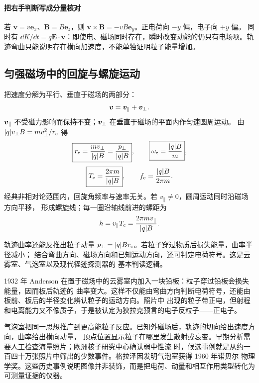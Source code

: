 {%
\paragraph{把右手判断写成分量核对}
若 $\boldsymbol v=v\boldsymbol e_x$、$\boldsymbol B=B\boldsymbol e_z$，则
$\boldsymbol v\times\boldsymbol B=-vB\boldsymbol e_y$。正电荷向 $-y$ 偏，电子向 $+y$ 偏。
同时有 $\dd K/\dd t=q\boldsymbol E\cdot\boldsymbol v$：即使电、磁场同时存在，瞬时改变动能的仍只有电场项。轨迹弯曲只能说明存在横向加速度，不能单独证明粒子能量增加。


\subsection{匀强磁场中的回旋与螺旋运动}


把速度分解为平行、垂直于磁场的两部分：
\begin{equation}
  \bm{v}=\bm{v}_\parallel+\bm{v}_\perp .
\end{equation}
$\bm{v}_\parallel$ 不受磁力影响而保持不变；$\bm{v}_\perp$ 在垂直于磁场的平面内作匀速圆周运动。
由 $|q|v_\perp B=mv_\perp^2/r_{\rm c}$ 得
\begin{equation}
  \boxed{r_{\rm c}=\frac{mv_\perp}{|q|B}=\frac{p_\perp}{|q|B}},
  \qquad
  \boxed{\omega_{\rm c}=\frac{|q|B}{m}},
\end{equation}
\begin{equation}
  \boxed{T_{\rm c}=\frac{2\pi m}{|q|B}},
  \qquad
  f_{\rm c}=\frac{|q|B}{2\pi m}.
\end{equation}
经典非相对论范围内，回旋角频率与速率无关。若 $v_\parallel\ne0$，圆周运动同时沿磁场方向平移，
形成螺旋线；每一圈沿轴线前进的螺距为
\begin{equation}
  h=v_\parallel T_{\rm c}=\frac{2\pi m v_\parallel}{|q|B}.
\end{equation}

\gyroHelixDiagram

轨迹曲率还能反推出粒子动量 $p_\perp=|q|Br_{\rm c}$。若粒子穿过物质后损失能量，曲率半径减小；
结合弯曲方向、磁场方向和已知运动方向，还可判定电荷符号。这是云雾室、气泡室以及现代径迹探测器的
基本判读逻辑。

1932 年 Anderson 在置于磁场中的云雾室内加入一块铅板：粒子穿过铅板会损失能量，因而板后轨迹的
曲率变大。这样不仅能由弯曲方向判断电荷符号，还能由板前、板后的半径变化辨认粒子的运动方向。照片中
出现的粒子带正电，但射程和电离能力又不像质子，于是被认定为狄拉克预言的电子反粒子——正电子。

气泡室把同一思想推广到更高能粒子反应。已知外磁场后，轨迹的切向给出速度方向，曲率给出横向动量，
顶点位置显示粒子在哪里发生散射或衰变。早期分析需要人工检查海量照片；欧洲核子研究中心确认弱中性流
时，候选事例就是从约一百四十万张照片中筛出的少数事件。格拉泽因发明气泡室获得 1960 年诺贝尔
物理学奖。这些历史事例说明图像并非装饰，而是把电荷、动量和相互作用类型转化为可测量证据的仪器。

}
